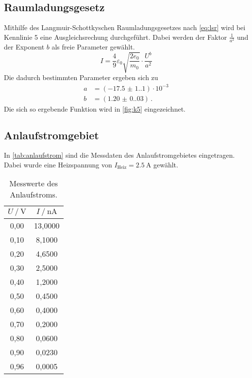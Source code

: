 \subsection{Raumladungsgesetz}

Mithilfe des Langmuir-Schottkyschen Raumladungsgesetzes nach \autoref{eq:lsr} wird bei Kennlinie 5 eine Ausgleichsrechung durchgeführt. 
Dabei werden der Faktor $\frac{1}{a^{2}}$ und der Exponent $b$ als freie Parameter gewählt.
\begin{equation*}
  I= \frac{4}{9} \varepsilon_{0} \sqrt{\frac{2 e_{0}}{m_{0}}} \cdot \frac{U^{b}}{a^2}
\end{equation*}
Die dadurch bestimmten Parameter ergeben sich zu
\begin{align*}
  a &= (\num{-17.5(1.1)}) \cdot 10^{-3} \\
  b &= (\num{1.20(0.03)}) \, . 
\end{align*}
Die sich so ergebende Funktion wird in \autoref{fig:k5} eingezeichnet.


\subsection{Anlaufstromgebiet}

In \autoref{tab:anlaufstrom} sind die Messdaten des Anlaufstromgebietes eingetragen. Dabei wurde
eine Heizspannung von $I_{\text{Heiz}} = \qty{2.5}{\ampere}$ gewählt.
\begin{table}
  \centering
  \caption{Messwerte des Anlaufstroms.}
  \label{tab:anlaufstrom}
  \begin{tabular}{c c}
    \toprule
    $U \mathbin{/} \unit{\volt}$ &
    $I \mathbin{/} \unit{\nano\ampere}$ \\
    \midrule
    0,00 & 13,0000 \\
    0,10 & 8,1000 \\
    0,20 & 4,6500 \\
    0,30 & 2,5000 \\
    0,40 & 1,2000 \\
    0,50 & 0,4500 \\
    0,60 & 0,4000 \\
    0,70 & 0,2000 \\
    0,80 & 0,0600 \\
    0,90 & 0,0230 \\
    0,96 & 0,0005 \\
    \bottomrule
  \end{tabular}
\end{table}

